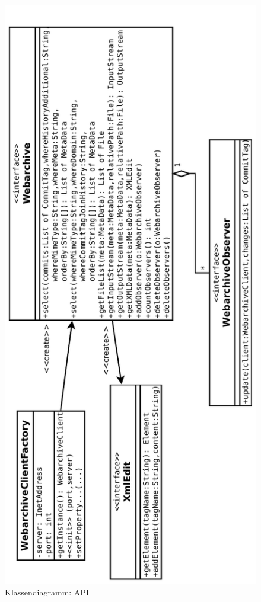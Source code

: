 \begin{figure}[!h]
	\centering
	\label{dia:design:frontend:cl:api}
	\includegraphics[angle=270, width=\textwidth]{design/frontend/classes/api-Klassen.pdf}
	\caption{Klassendiagramm: API}
\end{figure}

